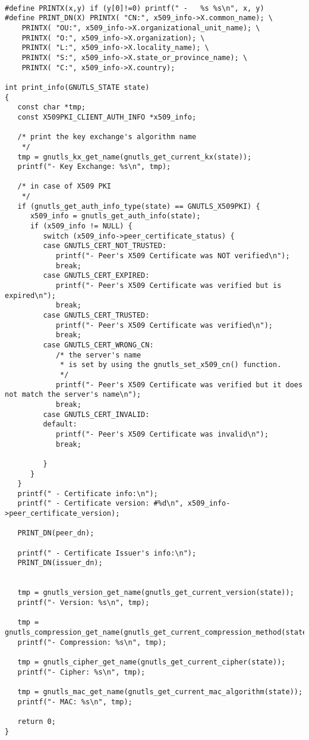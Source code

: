 \begin{verbatim}

#define PRINTX(x,y) if (y[0]!=0) printf(" -   %s %s\n", x, y)
#define PRINT_DN(X) PRINTX( "CN:", x509_info->X.common_name); \
	PRINTX( "OU:", x509_info->X.organizational_unit_name); \
	PRINTX( "O:", x509_info->X.organization); \
	PRINTX( "L:", x509_info->X.locality_name); \
	PRINTX( "S:", x509_info->X.state_or_province_name); \
	PRINTX( "C:", x509_info->X.country);

int print_info(GNUTLS_STATE state)
{
   const char *tmp;
   const X509PKI_CLIENT_AUTH_INFO *x509_info;

   /* print the key exchange's algorithm name
    */
   tmp = gnutls_kx_get_name(gnutls_get_current_kx(state));
   printf("- Key Exchange: %s\n", tmp);

   /* in case of X509 PKI
    */
   if (gnutls_get_auth_info_type(state) == GNUTLS_X509PKI) {
      x509_info = gnutls_get_auth_info(state);
      if (x509_info != NULL) {
         switch (x509_info->peer_certificate_status) {
         case GNUTLS_CERT_NOT_TRUSTED:
            printf("- Peer's X509 Certificate was NOT verified\n");
            break;
         case GNUTLS_CERT_EXPIRED:
            printf("- Peer's X509 Certificate was verified but is expired\n");
            break;
         case GNUTLS_CERT_TRUSTED:
            printf("- Peer's X509 Certificate was verified\n");
            break;
         case GNUTLS_CERT_WRONG_CN:
            /* the server's name
             * is set by using the gnutls_set_x509_cn() function.
             */
            printf("- Peer's X509 Certificate was verified but it does not match the server's name\n");
            break;
         case GNUTLS_CERT_INVALID:
         default:
            printf("- Peer's X509 Certificate was invalid\n");
            break;

         }
      }
   }
   printf(" - Certificate info:\n");
   printf(" - Certificate version: #%d\n", x509_info->peer_certificate_version);

   PRINT_DN(peer_dn);

   printf(" - Certificate Issuer's info:\n");
   PRINT_DN(issuer_dn);


   tmp = gnutls_version_get_name(gnutls_get_current_version(state));
   printf("- Version: %s\n", tmp);

   tmp = gnutls_compression_get_name(gnutls_get_current_compression_method(state));
   printf("- Compression: %s\n", tmp);

   tmp = gnutls_cipher_get_name(gnutls_get_current_cipher(state));
   printf("- Cipher: %s\n", tmp);

   tmp = gnutls_mac_get_name(gnutls_get_current_mac_algorithm(state));
   printf("- MAC: %s\n", tmp);

   return 0;
}

\end{verbatim}
